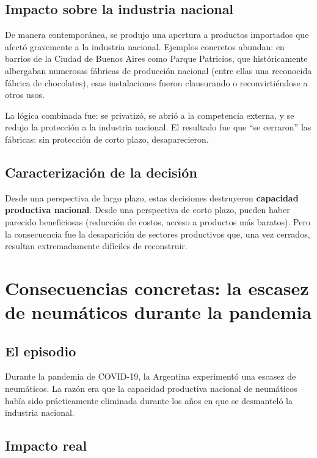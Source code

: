 \documentclass[12pt,oneside]{book}
\begin{document}
\subsection{Impacto sobre la industria nacional}

De manera contemporánea, se produjo una apertura a productos importados que afectó gravemente a la industria nacional. Ejemplos concretos abundan: en barrios de la Ciudad de Buenos Aires como Parque Patricios, que históricamente albergaban numerosas fábricas de producción nacional (entre ellas una reconocida fábrica de chocolates), esas instalaciones fueron clausurando o reconvirtiéndose a otros usos.

La lógica combinada fue: se privatizó, se abrió a la competencia externa, y se redujo la protección a la industria nacional. El resultado fue que ``se cerraron'' las fábricas: sin protección de corto plazo, desaparecieron.

\subsection{Caracterización de la decisión}

Desde una perspectiva de largo plazo, estas decisiones destruyeron \textbf{capacidad productiva nacional}. Desde una perspectiva de corto plazo, pueden haber parecido beneficiosas (reducción de costos, acceso a productos más baratos). Pero la consecuencia fue la desaparición de sectores productivos que, una vez cerrados, resultan extremadamente difíciles de reconstruir.

\section{Consecuencias concretas: la escasez de neumáticos durante la pandemia}

\subsection{El episodio}

Durante la pandemia de COVID-19, la Argentina experimentó una escasez de neumáticos. La razón era que la capacidad productiva nacional de neumáticos había sido prácticamente eliminada durante los años en que se desmanteló la industria nacional.

\subsection{Impacto real}
\end{document}
